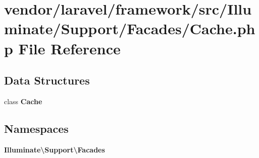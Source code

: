 \section{vendor/laravel/framework/src/\+Illuminate/\+Support/\+Facades/\+Cache.php File Reference}
\label{vendor_2laravel_2framework_2src_2_illuminate_2_support_2_facades_2cache_8php}
\subsection*{Data Structures}
\begin{DoxyCompactItemize}
\item 
class {\bf Cache}
\end{DoxyCompactItemize}
\subsection*{Namespaces}
\begin{DoxyCompactItemize}
\item 
 {\bf Illuminate\textbackslash{}\+Support\textbackslash{}\+Facades}
\end{DoxyCompactItemize}
